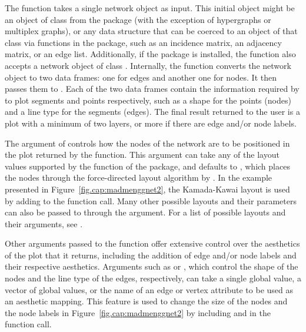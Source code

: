 The  function takes a single network object as input. This initial object might be an object of class  from the  package (with the exception of hypergraphs or multiplex graphs), or any data structure that can be coerced to an object of that class via functions in the  package, such as an incidence matrix, an adjacency matrix, or an edge list. Additionally, if the  package \citep{intergraph} is installed, the function  also accepts a network object of class . Internally, the function converts the network object to two data frames: one for edges and another one for nodes. It then passes them to . Each of the two data frames contain the information required by  to plot segments and points respectively, such as a shape for the points (nodes) and a line type for the segments (edges). The final result returned to the user is a plot with a minimum of two layers, or more if there are edge and/or node labels.

The  argument of  controls how the nodes of the network are to be positioned in the plot returned by the function. This argument can take any of the layout values supported by the  function of the  package, and defaults to , which places the nodes through the force-directed layout algorithm by \citet{fruchterman_reingold}. In the example presented in Figure~\ref{fig.cap:madmenggnet2}, the Kamada-Kawai layout is used by adding  to the function call. Many other possible layouts and their parameters can also be passed to  through the  argument. For a list of possible layouts and their arguments, see .

Other arguments passed to the  function offer extensive control over the aesthetics of the plot that it returns, including the addition of edge and/or node labels and their respective aesthetics. Arguments such as  or , which  control the shape of the nodes and the line type of the edges, respectively, can take a single global value, a vector of global values, or the name of an edge or vertex attribute to be used as an aesthetic mapping. This feature is used to change the size of the nodes and the node labels in Figure~\ref{fig.cap:madmenggnet2} by including  and  in the function call. 

